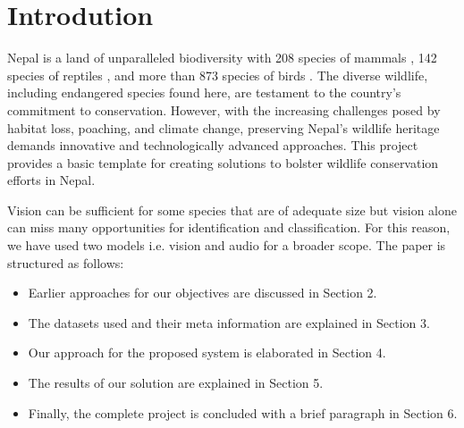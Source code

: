 \documentclass[fleqn, 10pt, twoside]{IOEGC}
\begin{document}
\maketitle
\thispagestyle{firstpage}

\section{Introdution}
Nepal is a land of unparalleled biodiversity with 208 species of mammals \cite{r1}, 142 species of reptiles \cite{r2}, and more than 873 species of birds \cite{r3}. The diverse wildlife, including endangered species found here, are testament to the country’s commitment to conservation. However, with the increasing challenges posed
by habitat loss, poaching, and climate change, preserving Nepal’s wildlife heritage demands innovative and technologically advanced approaches.
This project provides a basic template for creating solutions to bolster wildlife conservation efforts in Nepal.
\par
Vision can be sufficient for some species that are of adequate size but vision alone can miss many opportunities for identification and classification. For this reason, we have used two models i.e. vision and audio for a broader scope.
The paper is structured as follows:
\begin{itemize}
	\item Earlier approaches for our objectives are discussed in Section 2.
	\item The datasets used and their meta information are explained in Section 3.
	\item Our approach for the proposed system is elaborated in Section 4.
	\item The results of our solution are explained in Section 5.
	\item Finally, the complete project is concluded with a brief paragraph in Section 6.
\end{itemize}
\end{document}
